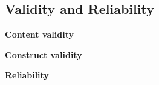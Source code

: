   \subsection{Validity and Reliability}\label{sec:validityandreliability}

    {\bf Content validity}

    {\bf Construct validity}

    {\bf Reliability}

  


 

  

  


